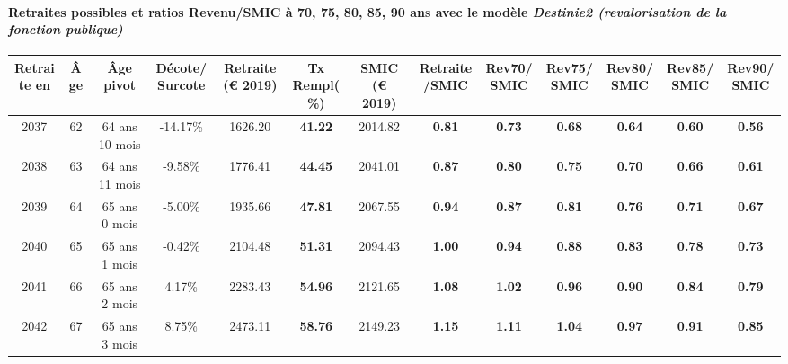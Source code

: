 \paragraph{Retraites possibles et ratios Revenu/SMIC à 70, 75, 80, 85, 90 ans avec le modèle \emph{Destinie2 (revalorisation de la fonction publique)}}  
 
{ \scriptsize \begin{center} 
\begin{tabular}[htb]{|c|c||c|c||c|c||c||c|c|c|c|c|c|} 
\hline 
 Retraite en &  Âge &  Âge pivot &  Décote/Surcote &  Retraite (\euro{} 2019) &  Tx Rempl(\%) &  SMIC (\euro{} 2019) &  Retraite/SMIC &  Rev70/SMIC &  Rev75/SMIC &  Rev80/SMIC &  Rev85/SMIC &  Rev90/SMIC \\ 
\hline \hline 
 2037 &  62 &  64 ans 10 mois &  -14.17\% &  1626.20 &  {\bf 41.22} &  2014.82 &  {\bf {\color{red} 0.81}} &  {\bf {\color{red} 0.73}} &  {\bf {\color{red} 0.68}} &  {\bf {\color{red} 0.64}} &  {\bf {\color{red} 0.60}} &  {\bf {\color{red} 0.56}} \\ 
\hline 
 2038 &  63 &  64 ans 11 mois &  -9.58\% &  1776.41 &  {\bf 44.45} &  2041.01 &  {\bf {\color{red} 0.87}} &  {\bf {\color{red} 0.80}} &  {\bf {\color{red} 0.75}} &  {\bf {\color{red} 0.70}} &  {\bf {\color{red} 0.66}} &  {\bf {\color{red} 0.61}} \\ 
\hline 
 2039 &  64 &  65 ans 0 mois &  -5.00\% &  1935.66 &  {\bf 47.81} &  2067.55 &  {\bf {\color{red} 0.94}} &  {\bf {\color{red} 0.87}} &  {\bf {\color{red} 0.81}} &  {\bf {\color{red} 0.76}} &  {\bf {\color{red} 0.71}} &  {\bf {\color{red} 0.67}} \\ 
\hline 
 2040 &  65 &  65 ans 1 mois &  -0.42\% &  2104.48 &  {\bf 51.31} &  2094.43 &  {\bf 1.00} &  {\bf {\color{red} 0.94}} &  {\bf {\color{red} 0.88}} &  {\bf {\color{red} 0.83}} &  {\bf {\color{red} 0.78}} &  {\bf {\color{red} 0.73}} \\ 
\hline 
 2041 &  66 &  65 ans 2 mois &  4.17\% &  2283.43 &  {\bf 54.96} &  2121.65 &  {\bf 1.08} &  {\bf 1.02} &  {\bf {\color{red} 0.96}} &  {\bf {\color{red} 0.90}} &  {\bf {\color{red} 0.84}} &  {\bf {\color{red} 0.79}} \\ 
\hline 
 2042 &  67 &  65 ans 3 mois &  8.75\% &  2473.11 &  {\bf 58.76} &  2149.23 &  {\bf 1.15} &  {\bf 1.11} &  {\bf 1.04} &  {\bf {\color{red} 0.97}} &  {\bf {\color{red} 0.91}} &  {\bf {\color{red} 0.85}} \\ 
\hline 
\hline 
\end{tabular} 
\end{center} } 

